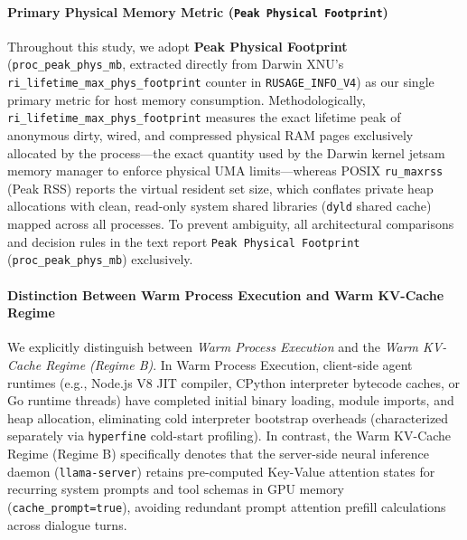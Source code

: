 \documentclass[11pt,a4paper]{article}
\begin{document}
\paragraph{Primary Physical Memory Metric (\texttt{Peak Physical Footprint})}
Throughout this study, we adopt \textbf{Peak Physical Footprint} (\texttt{proc\_peak\_phys\_mb}, extracted directly from Darwin XNU's \texttt{ri\_lifetime\_max\_phys\_footprint} counter in \texttt{RUSAGE\_INFO\_V4}) as our single primary metric for host memory consumption. Methodologically, \texttt{ri\_lifetime\_max\_phys\_footprint} measures the exact lifetime peak of anonymous dirty, wired, and compressed physical RAM pages exclusively allocated by the process—the exact quantity used by the Darwin kernel jetsam memory manager to enforce physical UMA limits—whereas POSIX \texttt{ru\_maxrss} (Peak RSS) reports the virtual resident set size, which conflates private heap allocations with clean, read-only system shared libraries (\texttt{dyld} shared cache) mapped across all processes. To prevent ambiguity, all architectural comparisons and decision rules in the text report \texttt{Peak Physical Footprint} (\texttt{proc\_peak\_phys\_mb}) exclusively.

\paragraph{Distinction Between Warm Process Execution and Warm KV-Cache Regime}
We explicitly distinguish between \textit{Warm Process Execution} and the \textit{Warm KV-Cache Regime (Regime B)}. In Warm Process Execution, client-side agent runtimes (e.g., Node.js V8 JIT compiler, CPython interpreter bytecode caches, or Go runtime threads) have completed initial binary loading, module imports, and heap allocation, eliminating cold interpreter bootstrap overheads (characterized separately via \texttt{hyperfine} cold-start profiling). In contrast, the Warm KV-Cache Regime (Regime B) specifically denotes that the server-side neural inference daemon (\texttt{llama-server}) retains pre-computed Key-Value attention states for recurring system prompts and tool schemas in GPU memory (\texttt{cache\_prompt=true}), avoiding redundant prompt attention prefill calculations across dialogue turns.
\end{document}
